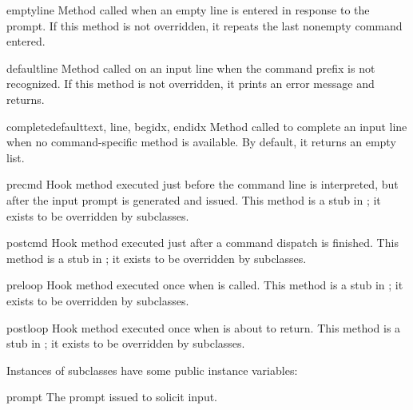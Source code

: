 \begin{methoddesc}{emptyline}{}
Method called when an empty line is entered in response to the prompt.
If this method is not overridden, it repeats the last nonempty command
entered.  
\end{methoddesc}

\begin{methoddesc}{default}{line}
Method called on an input line when the command prefix is not
recognized. If this method is not overridden, it prints an
error message and returns.
\end{methoddesc}

\begin{methoddesc}{completedefault}{text, line, begidx, endidx}
Method called to complete an input line when no command-specific
 method is available.  By default, it returns an
empty list.
\end{methoddesc}

\begin{methoddesc}{precmd}{}
Hook method executed just before the command line is interpreted, but
after the input prompt is generated and issued.  This
method is a stub in ; it exists to be overridden by
subclasses.
\end{methoddesc}

\begin{methoddesc}{postcmd}{}
Hook method executed just after a command dispatch is finished.  This
method is a stub in ; it exists to be overridden by
subclasses.
\end{methoddesc}

\begin{methoddesc}{preloop}{}
Hook method executed once when  is called.  This
method is a stub in ; it exists to be overridden by
subclasses.
\end{methoddesc}

\begin{methoddesc}{postloop}{}
Hook method executed once when  is about to return.
This method is a stub in ; it exists to be overridden by
subclasses.
\end{methoddesc}

Instances of  subclasses have some public instance variables:

\begin{memberdesc}{prompt}
The prompt issued to solicit input.
\end{memberdesc}

